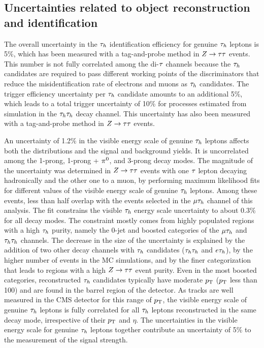 \subsection{Uncertainties related to object reconstruction and identification}

The overall uncertainty in the $\tau_{h}$ identification efficiency for genuine $\tau_{h}$ leptons is 5\%, which has been measured with a tag-and-probe method in $Z\to\tau\tau$ events.
This number is not fully correlated among the di-$\tau$ channels because the $\tau_{h}$ candidates are required to pass
different working points of the discriminators that reduce the misidentification rate of electrons and muons as $\tau_{h}$ candidates.
The trigger efficiency uncertainty per $\tau_{h}$ candidate amounts to an additional 5\%, which leads to a total trigger uncertainty of 10\% for processes estimated from simulation in the $\tau_{h}\tau_{h}$ decay channel. This uncertainty has also been measured with a tag-and-probe method in $Z\to\tau\tau$ events.

An uncertainty of 1.2\% in the visible energy scale of genuine $\tau_{h}$ leptons affects both the distributions and the
signal and background yields. It is uncorrelated among the 1-prong, 1-prong + $\pi^{0}$, and
3-prong decay modes.
The magnitude of the uncertainty was determined in $Z\to\tau\tau$ events with one $\tau$ lepton decaying hadronically and the other one to a muon, by performing maximum likelihood fits for different values of the visible energy scale of genuine $\tau_{h}$ leptons. Among these events, less than half overlap with the events selected in the $\mu\tau_{h}$ channel of this analysis. The fit constrains the visible $\tau_{h}$ energy scale uncertainty to about
0.3\% for all decay modes. The constraint mostly comes from highly populated regions with a high $\tau_{h}$ purity, namely the 0-jet and boosted categories of the $\mu\tau_{h}$ and $\tau_{h}\tau_{h}$ channels. The decrease in the size of the uncertainty is explained by the addition of two other decay channels
with $\tau_{h}$ candidates ($\tau_{h}\tau_{h}$ and $e\tau_{h}$), by the higher number of events in the MC simulations, and by the finer categorization that leads to regions with a high $Z\to\tau\tau$ event purity.
Even in the most boosted categories, reconstructed $\tau_{h}$ candidates typically have moderate $p_\mathrm{T}$ ($p_\mathrm{T}$ less than 100\GeV) and are
found in the barrel region of the detector. As tracks are well measured in the CMS detector for this range of $p_\mathrm{T}$,
the visible energy scale of genuine $\tau_{h}$ leptons is fully correlated for all $\tau_{h}$ leptons reconstructed in the same decay mode, irrespective of their $p_\mathrm{T}$ and $\eta$. The uncertainties in the visible energy scale for genuine $\tau_{h}$ leptons together contribute an uncertainty of 5\% to the measurement of the signal strength.

